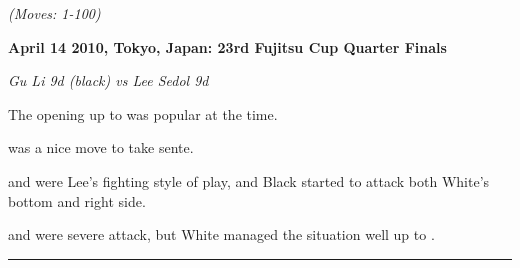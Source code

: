 \documentclass[letterpaper,12pt]{memoir}
\newcommand{\subtext}[1]{\centerline{\textit{#1}}}
\begin{document}
\subtext{(Moves: 1-100)}

\textbf{April 14 2010, Tokyo, Japan: 23rd Fujitsu Cup Quarter Finals}

\textit{Gu Li 9d (black) vs Lee Sedol 9d}

The opening up to {} was popular at the time.

{} was a nice move to take sente.

{} and {} were Lee's fighting style of play, and Black started to attack both White's bottom and right side.

{} and {} were severe attack, but White managed the situation well up to {}.


\vfill

\rule{\textwidth}{0.5pt}
\end{document}
